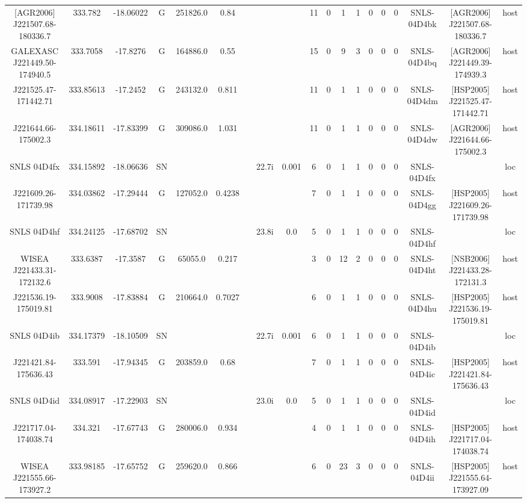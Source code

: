 \begin{table}
\begin{tabular}{ccccccccccccccccccc}
[AGR2006] J221507.68-180336.7 & 333.782 & -18.06022 & G & 251826.0 & 0.84 &  &  &  & 11 & 0 & 1 & 1 & 0 & 0 & 0 & SNLS-04D4bk & [AGR2006] J221507.68-180336.7 & host \\
GALEXASC J221449.50-174940.5 & 333.7058 & -17.8276 & G & 164886.0 & 0.55 &  &  &  & 15 & 0 & 9 & 3 & 0 & 0 & 0 & SNLS-04D4bq & [AGR2006] J221449.39-174939.3 & host \\
[HSP2005] J221525.47-171442.71 & 333.85613 & -17.2452 & G & 243132.0 & 0.811 &  &  &  & 11 & 0 & 1 & 1 & 0 & 0 & 0 & SNLS-04D4dm & [HSP2005] J221525.47-171442.71 & host \\
[AGR2006] J221644.66-175002.3 & 334.18611 & -17.83399 & G & 309086.0 & 1.031 &  &  &  & 11 & 0 & 1 & 1 & 0 & 0 & 0 & SNLS-04D4dw & [AGR2006] J221644.66-175002.3 & host \\
SNLS 04D4fx & 334.15892 & -18.06636 & SN &  &  &  & 22.7i & 0.001 & 6 & 0 & 1 & 1 & 0 & 0 & 0 & SNLS-04D4fx &  & loc \\
[HSP2005] J221609.26-171739.98 & 334.03862 & -17.29444 & G & 127052.0 & 0.4238 &  &  &  & 7 & 0 & 1 & 1 & 0 & 0 & 0 & SNLS-04D4gg & [HSP2005] J221609.26-171739.98 & host \\
SNLS 04D4hf & 334.24125 & -17.68702 & SN &  &  &  & 23.8i & 0.0 & 5 & 0 & 1 & 1 & 0 & 0 & 0 & SNLS-04D4hf &  & loc \\
WISEA J221433.31-172132.6 & 333.6387 & -17.3587 & G & 65055.0 & 0.217 &  &  &  & 3 & 0 & 12 & 2 & 0 & 0 & 0 & SNLS-04D4ht & [NSB2006] J221433.28-172131.3 & host \\
[HSP2005] J221536.19-175019.81 & 333.9008 & -17.83884 & G & 210664.0 & 0.7027 &  &  &  & 6 & 0 & 1 & 1 & 0 & 0 & 0 & SNLS-04D4hu & [HSP2005] J221536.19-175019.81 & host \\
SNLS 04D4ib & 334.17379 & -18.10509 & SN &  &  &  & 22.7i & 0.001 & 6 & 0 & 1 & 1 & 0 & 0 & 0 & SNLS-04D4ib &  & loc \\
[HSP2005] J221421.84-175636.43 & 333.591 & -17.94345 & G & 203859.0 & 0.68 &  &  &  & 7 & 0 & 1 & 1 & 0 & 0 & 0 & SNLS-04D4ic & [HSP2005] J221421.84-175636.43 & host \\
SNLS 04D4id & 334.08917 & -17.22903 & SN &  &  &  & 23.0i & 0.0 & 5 & 0 & 1 & 1 & 0 & 0 & 0 & SNLS-04D4id &  & loc \\
[HSP2005] J221717.04-174038.74 & 334.321 & -17.67743 & G & 280006.0 & 0.934 &  &  &  & 4 & 0 & 1 & 1 & 0 & 0 & 0 & SNLS-04D4ih & [HSP2005] J221717.04-174038.74 & host \\
WISEA J221555.66-173927.2 & 333.98185 & -17.65752 & G & 259620.0 & 0.866 &  &  &  & 6 & 0 & 23 & 3 & 0 & 0 & 0 & SNLS-04D4ii & [HSP2005] J221555.64-173927.09 & host \\

\end{tabular}
\end{table}
